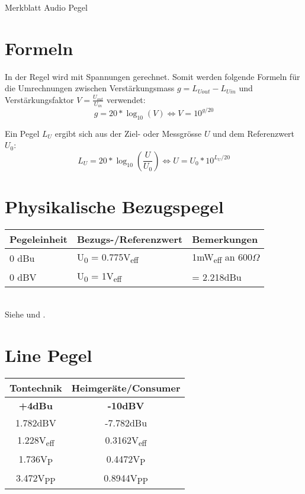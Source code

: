 ﻿\documentclass[9pt,german]{article}
\begin{document}
{\Large Merkblatt Audio Pegel}

\section*{Formeln}
In der Regel wird mit Spannungen gerechnet. Somit werden folgende Formeln für die Umrechnungen zwischen
Verstärkungsmass $g = L_{Uout} - L_{Uin}$ und Verstärkungsfaktor $V=\frac{U_{out}}{U_{in}}$ verwendet:
$$ g = 20 * \log_{10}(V) \Leftrightarrow V = 10^{g/20} $$

Ein Pegel $L_U$ ergibt sich aus der Ziel- oder Messgrösse $U$ und dem Referenzwert $U_0$:
$$ L_U = 20 * \log_{10}(\frac{U}{U_0})  \Leftrightarrow U = U_0 * 10^{L_U/20} $$



\section*{Physikalische Bezugspegel}
\begin{tabular}{|l|l|l|}
    \hline
    \textbf{Pegeleinheit} & \textbf{Bezugs-/Referenzwert} & \textbf{Bemerkungen} \\
    \hline
    0 dBu & U\textsubscript{0} = 0.775V\textsubscript{eff} & 1mW\textsubscript{eff} an 600$\Omega$ \\
    \hline
    0 dBV & U\textsubscript{0} = 1V\textsubscript{eff} &  = 2.218dBu \\
    \hline
\end{tabular}
\\

{\small Siehe \cite[Bezugspegel]{adt} und \cite{kirstein}.}



\section*{Line Pegel}
\begin{tabular}{|c|c|}
    \hline
    \textbf{Tontechnik} & \textbf{Heimgeräte/Consumer} \\
    \hline
    \textbf{+4dBu}              & \textbf{-10dBV} \\
    1.782dBV                    & -7.782dBu \\
    1.228V\textsubscript{eff}   & 0.3162V\textsubscript{eff} \\
    1.736V\textsubscript{P}     & 0.4472V\textsubscript{P} \\
    3.472V\textsubscript{PP}    & 0.8944V\textsubscript{PP} \\
    \hline
\end{tabular}
\\
\end{document}
